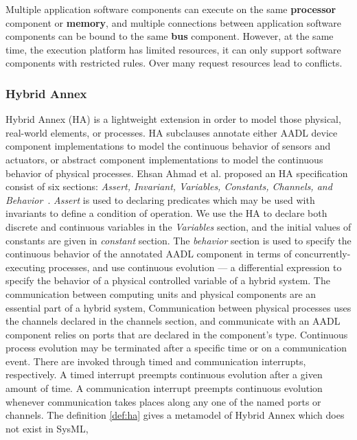 Multiple application software components can execute on the same \textbf{processor} component or \textbf{memory}, and multiple connections between application software components can be bound to the same \textbf{bus} component. 
However, at the same time, the execution platform has limited resources, it can only support software components with restricted rules. Over many request resources lead to conflicts.

\subsubsection{Hybrid Annex}
Hybrid Annex (HA) is a lightweight extension in order to model those physical, real-world elements, or processes. HA subclauses annotate either AADL device component implementations to model the continuous behavior of sensors and actuators, or abstract component implementations to model the continuous behavior of physical processes. Ehsan Ahmad et al. proposed an HA specification consist of six sections: \textit{Assert, Invariant, Variables, Constants, Channels, and Behavior}~\cite{Ahmad:2014:HAA:2692956.2663178}. \textit{Assert} is used to declaring predicates which may be used with invariants to define a condition of operation. We use the HA to declare both discrete and continuous variables in the \textit{Variables} section, and the initial values of constants are given in \textit{constant} section. The \textit{behavior} section is used to specify the continuous behavior of the annotated AADL component in terms of concurrently-executing processes, and use continuous evolution --- a differential expression to specify the behavior of a physical controlled variable of a hybrid system. The communication between computing units and physical components are an essential part of a hybrid system, Communication between physical processes uses the channels declared in the channels section, and communicate with an AADL component relies on ports that are declared in the component's type. Continuous process evolution may be terminated after a specific time or on a communication event. There are invoked through timed and communication interrupts, respectively. A timed interrupt preempts continuous evolution after a given amount of time. A communication interrupt preempts continuous evolution whenever communication takes places along any one of the named ports or channels. The definition \ref{def:ha} gives a metamodel of Hybrid Annex which does not exist in SysML,  

